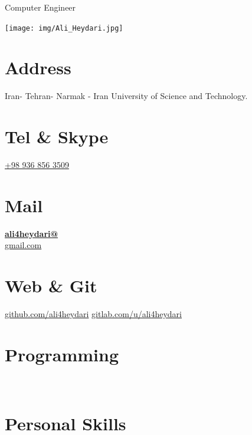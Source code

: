 \documentclass[a4paper]{friggeri-cv}
\begin{document}
      {Computer Engineer}


\begin{aside}
  \texttt{[image: img/Ali\_Heydari.jpg]}
  \section{Address}
Iran- Tehran- Narmak -
Iran University of Science and Technology.
    ~
  \section{Tel \& Skype}
   \href{tel:+989368563509}{+98 936 856 3509}
    ~
  \section{Mail}
 \href{mailto:ali4heydari@gmail.com}{\textbf{ali4heydari@}\\gmail.com}
    ~
  \section{Web \& Git}
     \href{https://github.com/ali4heydari}{github.com/ali4heydari}
    \href{https://gitlab.com/u/ali4heydari}{gitlab.com/u/ali4heydari}
    ~
  \section{Programming}
    ~
  \section{Personal Skills}
    ~
\end{aside}
~
\end{document}
